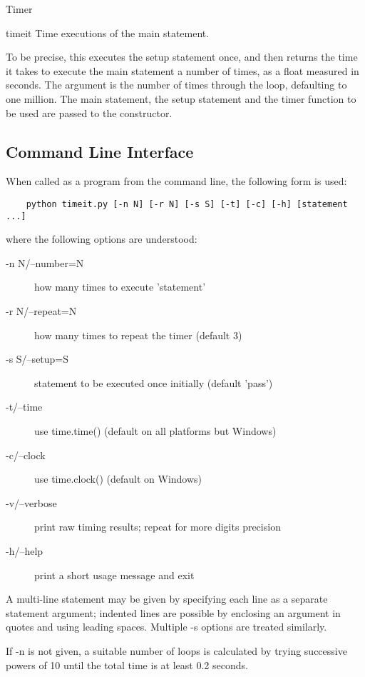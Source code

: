 \begin{classdesc}{Timer}{}
\begin{methoddesc}{timeit}{}
Time  executions of the main statement.

To be precise, this executes the setup statement once, and then returns the
time it takes to execute the main statement a number of times, as a float
measured in seconds.  The argument is the number of times through the loop,
defaulting to one million.  The main statement, the setup statement and the
timer function to be used are passed to the constructor.
\end{methoddesc}
\end{classdesc}

\subsection{Command Line Interface}

When called as a program from the command line, the following form is used:

\begin{verbatim}
    python timeit.py [-n N] [-r N] [-s S] [-t] [-c] [-h] [statement ...]
\end{verbatim}

where the following options are understood:

\begin{description}
\item[-n N/--number=N] how many times to execute 'statement'
\item[-r N/--repeat=N] how many times to repeat the timer (default 3)
\item[-s S/--setup=S] statement to be executed once initially (default
'pass')
\item[-t/--time] use time.time() (default on all platforms but Windows)
\item[-c/--clock] use time.clock() (default on Windows)
\item[-v/--verbose] print raw timing results; repeat for more digits
precision 
\item[-h/--help] print a short usage message and exit
\end{description}

A multi-line statement may be given by specifying each line as a separate
statement argument; indented lines are possible by enclosing an argument in
quotes and using leading spaces.  Multiple -s options are treated similarly.

If -n is not given, a suitable number of loops is calculated by trying
successive powers of 10 until the total time is at least 0.2 seconds.

